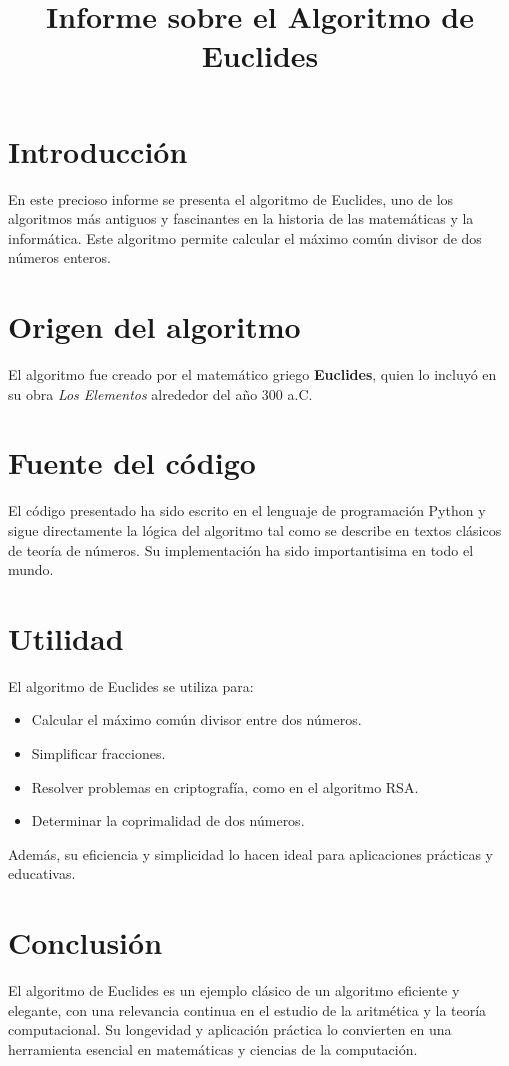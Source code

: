 \documentclass[12pt]{article}
\title{Informe sobre el Algoritmo de Euclides}
\author{}
\date{}
\begin{document}
\maketitle

\section*{Introducción}
En este precioso informe se presenta el algoritmo de Euclides, uno de los algoritmos más antiguos y fascinantes en la historia de las matemáticas y la informática. Este algoritmo permite calcular el máximo común divisor de dos números enteros.

\section*{Origen del algoritmo}
El algoritmo fue creado por el matemático griego \textbf{Euclides}, quien lo incluyó en su obra \emph{Los Elementos} alrededor del año 300 a.C.

\section*{Fuente del código}
El código presentado ha sido escrito en el lenguaje de programación Python y sigue directamente la lógica del algoritmo tal como se describe en textos clásicos de teoría de números. Su implementación ha sido importantisima en todo el mundo.

\section*{Utilidad}
El algoritmo de Euclides se utiliza para:
\begin{itemize}
    \item Calcular el máximo común divisor entre dos números.
    \item Simplificar fracciones.
    \item Resolver problemas en criptografía, como en el algoritmo RSA.
    \item Determinar la coprimalidad de dos números.
\end{itemize}

Además, su eficiencia y simplicidad lo hacen ideal para aplicaciones prácticas y educativas.

\section*{Conclusión}
El algoritmo de Euclides es un ejemplo clásico de un algoritmo eficiente y elegante, con una relevancia continua en el estudio de la aritmética y la teoría computacional. Su longevidad y aplicación práctica lo convierten en una herramienta esencial en matemáticas y ciencias de la computación.
\end{document}
